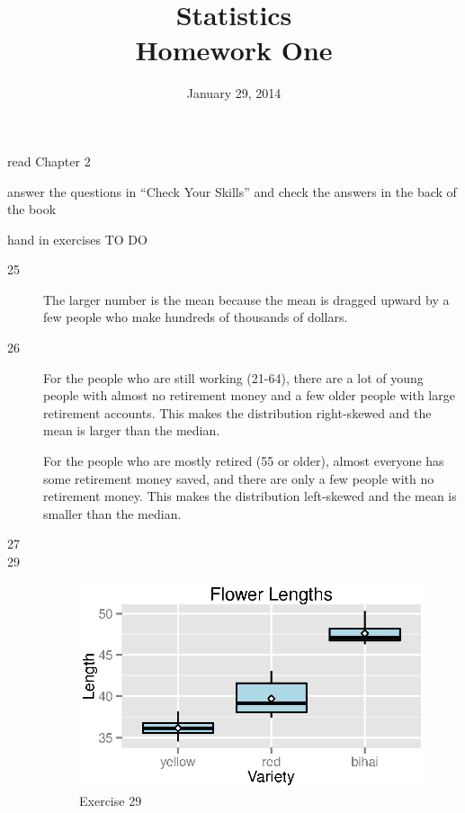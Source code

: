 \documentclass{exam}
\author{}
\date{January 29, 2014}
\title{Statistics \\ Homework One}
\begin{document}
  \maketitle

  \begin{itemize*}
    \item read Chapter 2 
    \item answer the questions in ``Check Your Skills'' and check the answers in the back of the book
    \item hand in exercises TO DO
  \end{itemize*}

  \ifprintanswers
    \begin{description}
      \item[25] The larger number is the mean because the mean is dragged upward by a few people who make hundreds of
        thousands of dollars.

      \item[26] For the people who are still working (21-64), there are a lot of young people with almost no retirement
        money and a few older people with large retirement accounts.  This makes the distribution right-skewed and the
        mean is larger than the median.

        For the people who are mostly retired (55 or older), almost everyone has some retirement money saved, and there
        are only a few people with no retirement money.  This makes the distribution left-skewed and the mean is smaller
        than the median.

      \item[27] 

      \item[29]
        \begin{figure}[H]
          \centering
          \includegraphics{figures/ex29.eps}
          \caption{Exercise 29}
        \end{figure}


\end{description}
\end{document}
